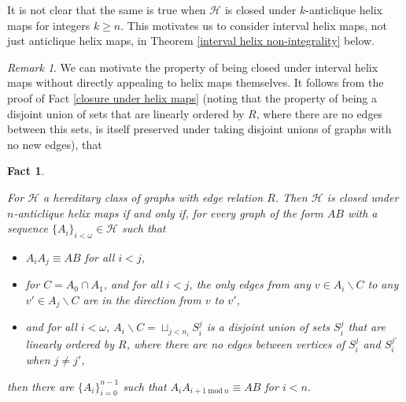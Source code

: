 \documentclass{amsart}
\newtheorem{fact}[theorem]{Fact}
\theoremstyle{definition}
\theoremstyle{remark}
\newtheorem{remark}[theorem]{Remark}
\numberwithin{equation}{section}
\begin{document}
    It is not clear that the same is true when $\mathcal{H}$ is closed under $k$-anticlique helix maps for integers $k \geq n$. This motivates us to consider interval helix maps, not just anticlique helix maps, in Theorem \ref{interval helix non-integrality} below.

    \begin{remark}\label{alternative motivation for being closed under special helix maps}
        We can motivate the property of being closed under interval helix maps without directly appealing to helix maps themselves. It follows from the proof of Fact \ref{closure under helix maps} (noting that the property of being a disjoint union of sets that are linearly ordered by $R$, where there are no edges between this sets, is itself preserved under taking disjoint unions of graphs with no new edges), that


        \begin{fact}\label{alternative definition of being closed under interval helix maps}

For $\mathcal{H}$ a hereditary class of graphs with edge relation $R$. Then $\mathcal{H}$ is closed under $n$-anticlique helix maps if and only if, for every graph of the form $AB$ with a sequence $\{A_{i}\}_{i < \omega} \in \mathcal{H}$ such that

\begin{itemize}
    \item $A_{i}A_{j} \equiv AB$ for all $i < j$,

    \item for $C = A_{0} \cap A_{1}$, and for all $i < j$, the only edges from any $v \in A_{i} \backslash C$ to any $v' \in A_{j} \backslash C$ are in the direction from $v$ to $v'$,

    
    \item and for all $i < \omega$, $A_{i} \backslash C =\sqcup_{j < n_{i}} S^{j}_{i}$ is a disjoint union of sets $S^{j}_{i}$ that are linearly ordered by $R$, where there are no edges between vertices of $S^{j}_{i}$ and $S^{j'}_{i}$ when $j \neq j'$,

    
\end{itemize}

then there are $\{A_{i}\}^{n-1}_{i = 0}$ such that $A_{i}A_{i+1 \mathrm{\: mod \:} n} \equiv AB$ for $i < n$.

 

            
        \end{fact}



\end{remark}
\end{document}

